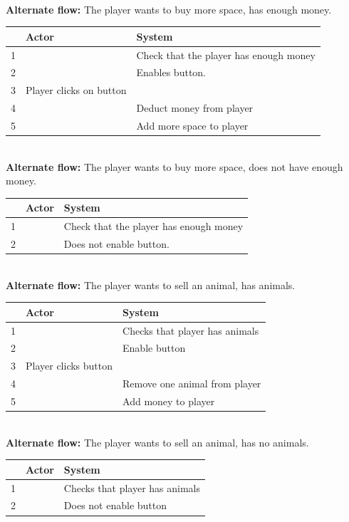 \documentclass{article}
\begin{document}
\vspace{5 mm}\\
\textbf{Alternate flow:} The player wants to buy more space, has enough money.
\vspace{1 mm}\\
\begin{tabular}{|c|l|l|} \hline
    & Actor & System \\ \hline
    1 & & Check that the player has enough money \\ \hline
    2 & & Enables button. \\ \hline
    3 & Player clicks on button \\ \hline
    4 & & Deduct money from player \\ \hline
    5 & & Add more space to player \\ \hline
\end{tabular}
\vspace{5 mm}\\
\textbf{Alternate flow:} The player wants to buy more space, does not have enough money.
\vspace{1 mm}\\
\begin{tabular}{|c|l|l|} \hline
    & Actor & System \\ \hline
    1 & & Check that the player has enough money \\ \hline
    2 & & Does not enable button. \\ \hline
\end{tabular}
\vspace{5 mm}\\
\textbf{Alternate flow:} The player wants to sell an animal, has animals.
\vspace{1 mm}\\
\begin{tabular}{|c|l|l|} \hline
    & Actor & System \\ \hline
    1 & & Checks that player has animals \\ \hline
    2 & & Enable button \\ \hline
    3 & Player clicks button & \\ \hline
    4 & & Remove one animal from player \\ \hline
    5 & & Add money to player \\ \hline
\end{tabular}
\vspace{5 mm}\\
\textbf{Alternate flow:} The player wants to sell an animal, has no animals.
\vspace{1 mm}\\
\begin{tabular}{|c|l|l|} \hline
    & Actor & System \\ \hline
    1 & & Checks that player has animals \\ \hline
    2 & & Does not enable button \\ \hline
\end{tabular}
\end{document}
